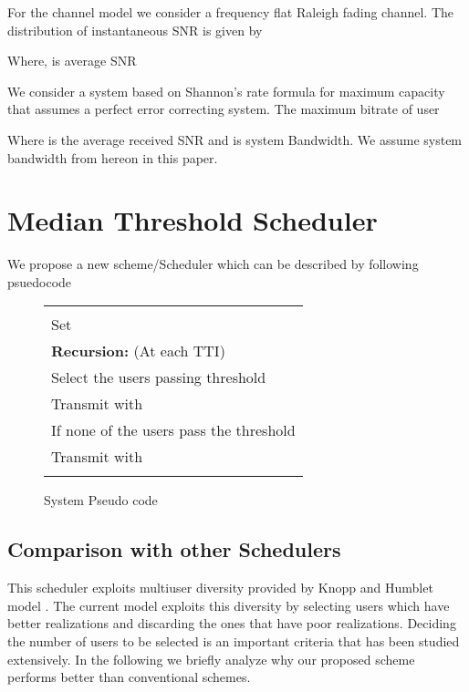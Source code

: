 \documentclass[conference]{IEEEtran}
\begin{document}
For the channel model we consider a frequency flat Raleigh fading channel. The distribution of instantaneous SNR is given by



Where,  is average SNR 

\label{1} 


We consider a system based on Shannon\textquoteright s rate formula for maximum capacity that assumes a perfect error correcting system. The maximum bitrate of user 

Where  is the average received SNR and  is system Bandwidth. We assume system bandwidth  from hereon in this paper.



\section{Median Threshold Scheduler}

We propose a new scheme/Scheduler which can be described by following psuedocode\\
\begin{figure}[h!]
\begin{center}\small
\begin{tabular}{|l|}\hline
\begin{minipage}{0.9\hsize}
\vspace{3mm}

\textbf{Intialization:}\\
Set  \\
\textbf{Recursion:} (At each TTI)\\
Select the users passing threshold  \\
Transmit with  \\
If none of the users pass the threshold \\
Transmit with \\ 
\vspace{1mm}
\end{minipage} \\ \hline
\end{tabular}
\end{center}
\caption{System Pseudo code}
\label{Pseudo-code}

\end{figure}
\subsection{Comparison with other Schedulers}


This scheduler exploits multiuser diversity provided by Knopp and Humblet model \cite{Knoop_and_Humblet}. The current model exploits this diversity by selecting users which have better realizations and discarding the ones that have poor realizations. Deciding the number of users to be selected is an important criteria that has been studied extensively. In the following we briefly analyze why our proposed scheme performs better than conventional schemes.
\end{document}
